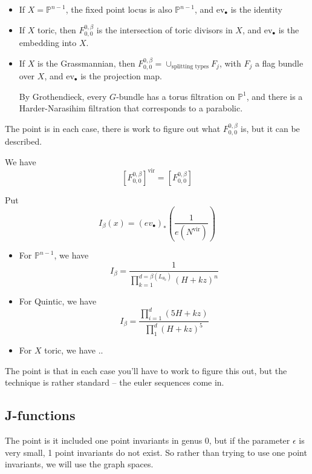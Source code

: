 \documentclass{amsart}
\theoremstyle{definition}
\newcommand{\proj}{\mathbb{P}}
\newcommand{\ev}{\text{ev}}
\newcommand{\vir}{\text{vir}}
\begin{document}
\begin{itemize}
\item
If $X=\proj^{n-1}$, the fixed point locus is also $\proj^{n-1}$, and $\ev_\bullet$ is the identity
\item If $X$ toric, then $F_{0,0}^{0,\beta}$ is the intersection of toric divisors in $X$, and $\ev_\bullet$ is the embedding into $X$.
\item If $X$ is the Grassmannian, then $F_{0,0}^{0,\beta}=\cup_{\text{splitting types}} F_j$, with $F_j$ a flag bundle over $X$, and $\ev_{\bullet}$ is the projection map.


By Grothendieck, every $G$-bundle has a torus filtration on $\proj^1$, and there is a Harder-Narasihim filtration that corresponds to a parabolic.
\end{itemize}
The point is in each case, there is work to figure out what $F_{0,0}^{0,\beta}$ is, but it can be described.

We have
$$[F_{0,0}^{0,\beta}]^\vir=[F_{0,0}^{0,\beta}]$$

Put $$I_\beta(x)=(ev_\bullet)_*\left(\frac{1}{e(N^\vir)}\right)$$

\begin{itemize}


\item For $\proj^{n-1}$, we have
$$I_\beta=\frac{1}{\prod_{k=1}^{d=\beta(L_{\theta_0})} (H+kz)^n}$$
\item For Quintic, we have
$$I_\beta=\frac{\prod_{i=1}^d (5H+kz)}{\prod_{1}^d (H+kz)^5}$$
\item For $X$ toric, we have ..



\end{itemize}

The point is that in each case you'll  have to work to figure this out, but the technique is rather standard -- the euler sequences come in.


\subsection{J-functions}

The point is it included one point invariants in genus 0, but if the parameter $\epsilon$ is very small, 1 point invariants do not exist.  So rather than trying to use one point invariants, we will use the graph spaces.
\end{document}
